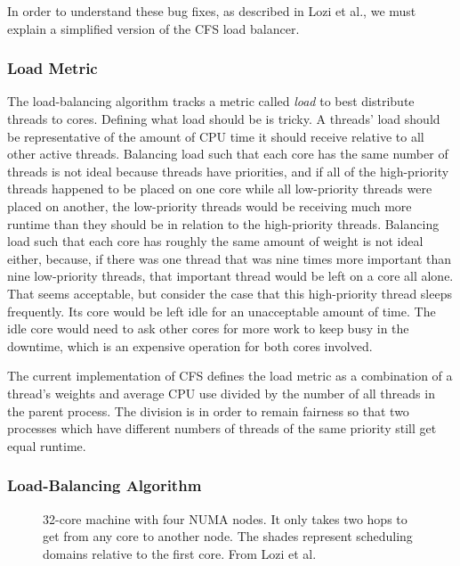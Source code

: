 \documentclass{sig-alternate}
\begin{document}
In order to understand these bug fixes, as described in Lozi et al., we must explain a simplified version of the CFS load balancer.~\cite{Lozi:2016}

\subsubsection{Load Metric}
\label{sec:loadmetric}

The load-balancing algorithm tracks a metric called \emph{load} to best distribute threads to cores. Defining what load should be is tricky. A threads' load should be representative of the amount of CPU time it should receive relative to all other active threads. Balancing load such that each core has the same number of threads is not ideal because threads have priorities, and if all of the high-priority threads happened to be placed on one core while all low-priority threads were placed on another, the low-priority threads would be receiving much more runtime than they should be in relation to the high-priority threads. Balancing load such that each core has roughly the same amount of weight is not ideal either, because, if there was one thread that was nine times more important than nine low-priority threads, that important thread would be left on a core all alone. That seems acceptable, but consider the case that this high-priority thread sleeps frequently. Its core would be left idle for an unacceptable amount of time. The idle core would need to ask other cores for more work to keep busy in the downtime, which is an expensive operation for both cores involved.~\cite{Lozi:2016}

The current implementation of CFS defines the load metric as a combination of a thread's weights and average CPU use divided by the number of all threads in the parent process. The division is in order to remain fairness so that two processes which have different numbers of threads of the same priority still get equal runtime.~\cite{Lozi:2016}

\subsubsection{Load-Balancing Algorithm}
\label{sec:loadbalancealg}

\begin{figure}
\centering
{}
\caption{32-core machine with four NUMA nodes. It only takes two hops to get from any core to another node. The shades represent scheduling domains relative to the first core. From Lozi et al.~\cite{Lozi:2016}}
\label{fig:domains}
\end{figure}
\end{document}
